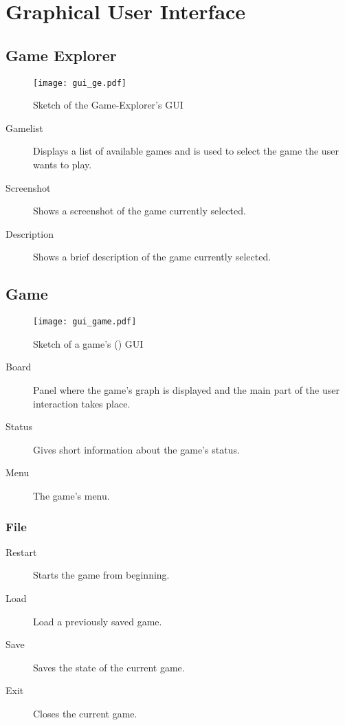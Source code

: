 \section{Graphical User Interface}
\subsection{Game Explorer}

\begin{figure}[h]
	\centering
	\texttt{[image: gui\_ge.pdf]}
	\caption{Sketch of the Game-Explorer's GUI}
	\label{img:GE_GUI}
\end{figure}

\begin{description}
	\item[Gamelist] Displays a list of available games and is used to select the game the user wants to play.
	\item[Screenshot] Shows a screenshot of the game currently selected.
	\item[Description] Shows a brief description of the game currently selected.
\end{description}

\subsection{Game} \label{REF:GUI_GAME}

\begin{figure}[H]
	\centering
	\texttt{[image: gui\_game.pdf]}
	\caption{Sketch of a game's (\twixt) \gls{GUI}}
	\label{img:GAME_GUI}
\end{figure}

\begin{description}
	\item[Board] Panel where the game's graph is displayed and the main part of the user interaction takes place.
	\item[Status] Gives short information about the game's status.
	\item[Menu] The game's menu.
\end{description}

\subsubsection{File}
\begin{description}
	\item[Restart] Starts the game from beginning.
	\item[Load] Load a previously saved game.
	\item[Save] Saves the state of the current game.
	\item[Exit] Closes the current game.
\end{description}
